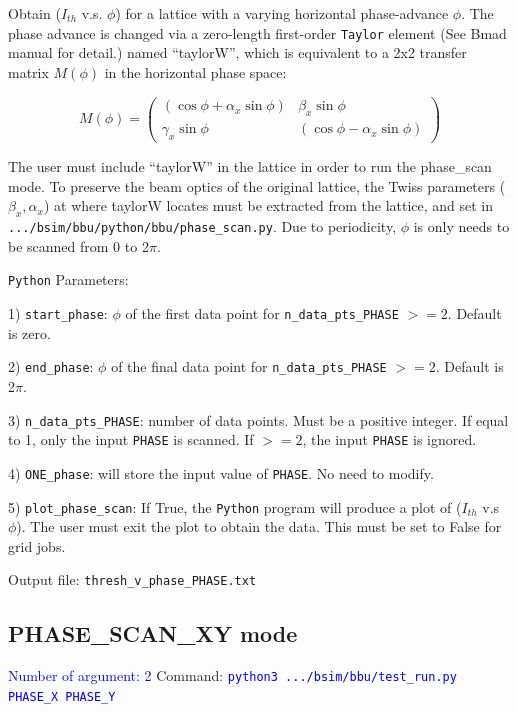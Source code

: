 \documentclass{hitec}
\begin{document}
Obtain ($I_{th}$ v.s. $\phi$) for a lattice with a varying horizontal phase-advance $\phi$. The phase advance is changed via a zero-length first-order \texttt{Taylor} element (See Bmad manual for detail.) named ``taylorW'', which is equivalent to a 2x2 transfer matrix $M(\phi)$ in the horizontal phase space:

\[
M(\phi) =
\begin{pmatrix}
   (\cos\phi+\alpha_{x}\sin\phi) & \beta_{x}\sin\phi \\ 
  \gamma_{x}\sin\phi &  (\cos\phi-\alpha_{x}\sin\phi)
\end{pmatrix}
\]


The user must include ``taylorW'' in the lattice in order to run the phase_scan mode. To preserve the beam optics of the original lattice, the Twiss parameters ($\beta_x, \alpha_x$) at where taylorW locates must be extracted from the lattice, and set in \texttt{.../bsim/bbu/python/bbu/phase_scan.py}. Due to periodicity, $\phi$ is only needs to be scanned from 0 to 2$\pi$.
       
\bigbreak
\texttt{Python} Parameters:

1) \texttt{start_phase}: $\phi$ of the first data point for \texttt{n_data_pts_PHASE} $>=2$. Default is zero.

2) \texttt{end_phase}: $\phi$ of the final data point for \texttt{n_data_pts_PHASE} $>=2$. Default is 2$\pi$.

3) \texttt{n_data_pts_PHASE}: number of data points. Must be a positive integer. If equal to 1, only the input \texttt{PHASE} is scanned. If $>=2$, the input \texttt{PHASE} is ignored.

4) \texttt{ONE_phase}: will store the input value of \texttt{PHASE}.  No need to modify.

5) \texttt{plot_phase_scan}: If True, the \texttt{Python} program will produce a plot of ($I_{th}$ v.s $\phi$). The user must exit the plot to obtain the data. This must be set to False for grid jobs.  

\bigbreak
Output file: \texttt{thresh_v_phase_PHASE.txt}

\subsection{PHASE_SCAN_XY mode}
\textcolor{blue}{Number of argument: 2}
\bigbreak
Command:  \textcolor{blue}{\texttt{python3 .../bsim/bbu/test_run.py  PHASE_X  PHASE_Y }}
\end{document}
